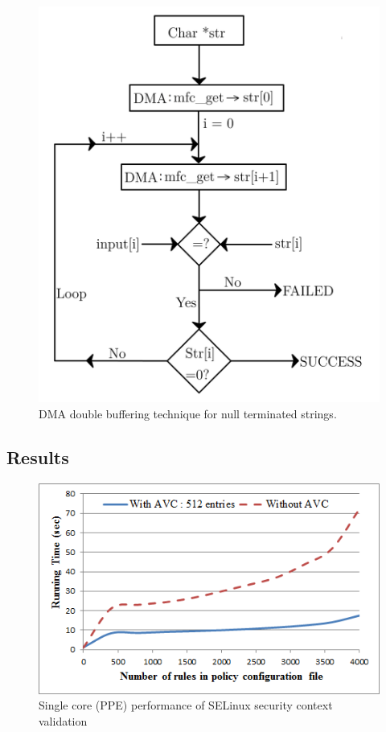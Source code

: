 \documentclass[conference]{IEEEtran}
\begin{document}
\begin{figure}
\centerline{\includegraphics[scale=0.45]{images/DMA.png}}
\caption{DMA double buffering technique for null terminated strings.}
\label{figDMA}
\vspace{-0.03cm}
\end{figure}


\subsection{Results}\label{results}

\begin{figure}
\centerline{\includegraphics[scale=0.65]{images/rules.png}}
\caption{Single core (PPE) performance of SELinux security context validation}
\label{figGraphRules}
\vspace{-0.01cm}
\end{figure}
\end{document}
